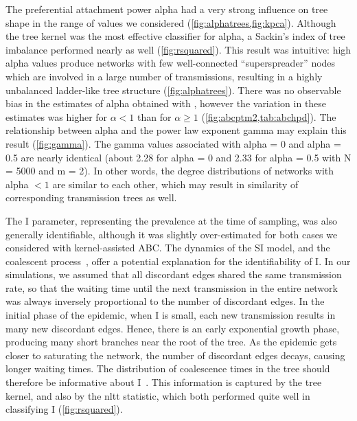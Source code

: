 The preferential attachment power \gls{alpha} had a very strong influence on
tree shape in the range of values we considered
(\cref{fig:alphatrees,fig:kpca}). Although the tree kernel was the most
effective classifier for \gls{alpha}, a Sackin's index of tree imbalance
performed nearly as well (\cref{fig:rsquared}). This result was intuitive: high
\gls{alpha} values produce networks with few well-connected ``superspreader''
nodes which are involved in a large number of transmissions, resulting in a
highly unbalanced ladder-like tree structure (\cref{fig:alphatrees}). 
There was no observable bias in the estimates of \gls{alpha} obtained with
, however the variation in these estimates was higher for
$\alpha < 1$ than for $\alpha \geq 1$ (\cref{fig:abcptm2,tab:abchpd}). The
relationship between \gls{alpha} and the power law exponent \gls{gamma} may
explain this result (\cref{fig:gamma}). The \gls{gamma} values associated with
\gls{alpha} = 0 and \gls{alpha} = 0.5 are nearly identical (about 2.28 for
\gls{alpha} = 0 and 2.33 for \gls{alpha} = 0.5 with \gls{N} = 5000 and \gls{m}
= 2). In other words, the degree distributions of networks with \gls{alpha} $<
1$ are similar to each other, which may result in similarity of corresponding
transmission trees as well. 

The \gls{I} parameter, representing the prevalence at the time of sampling, was
also generally identifiable, although it was slightly over-estimated for both
cases we considered with kernel-assisted \gls{ABC}. The dynamics of the \gls{SI} model,
and the coalescent process~\autocite{kingman1982coalescent}, offer a potential
explanation for the identifiability of \gls{I}. In our simulations, we assumed
that all discordant edges shared the same transmission rate, so that the
waiting time until the next transmission in the entire network was always
inversely proportional to the number of discordant edges. In the initial phase
of the epidemic, when \gls{I} is small, each new transmission results in many
new discordant edges. Hence, there is an early exponential growth phase,
producing many short branches near the root of the tree. As the epidemic gets
closer to saturating the network, the number of discordant edges decays,
causing longer waiting times. The distribution of coalescence times in the tree
should therefore be informative about \gls{I}~\autocite{volz2009phylodynamics}.
This information is captured by the tree kernel, and also by the \gls{nltt}
statistic, which both performed quite well in classifying \gls{I}
(\cref{fig:rsquared}). 

